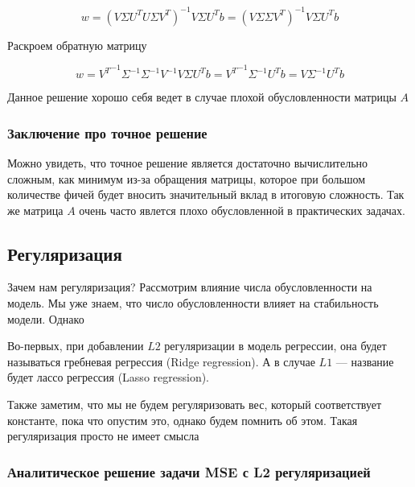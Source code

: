 \documentclass{article}
\begin{document}
    \begin{equation}
        w = (V \Sigma U^{T} U \Sigma V^{T})^{-1} V \Sigma U^{T} b = (V \Sigma \Sigma V^{T})^{-1} V \Sigma U^{T} b
    \end{equation}

    Раскроем обратную матрицу

    \begin{equation}
        w = {V^{T}}^{-1} \Sigma^{-1} \Sigma^{-1} V^{-1} V \Sigma U^{T} b = {V^{T}}^{-1} \Sigma^{-1}  U^{T} b = V \Sigma^{-1}  U^{T} b
    \end{equation}

    Данное решение хорошо себя ведет в случае плохой обусловленности матрицы $A$

    \subsubsection{Заключение про точное решение}

    Можно увидеть, что точное решение является достаточно вычислительно сложным, как минимум из-за обращения матрицы, которое при большом количестве фичей будет 
    вносить значительный вклад в итоговую сложность. Так же матрица $A$ очень часто явлется плохо обусловленной в практических задачах.  
    
    \subsection{Регуляризация}

    Зачем нам регуляризация? Рассмотрим влияние числа обусловленности на модель. Мы уже знаем, что 
    число обусловленности влияет на стабильность модели. Однако 

    Во-первых, при добавлении $L2$ регуляризации в модель регрессии, она будет называться гребневая регрессия (Ridge regression). А в случае
    $L1$ --- название будет лассо регрессия (Lasso regression). 
    
    Также заметим, что мы не будем регуляризовать вес, который соответствует константе, пока что опустим это, однако 
    будем помнить об этом. Такая регуляризация просто не имеет смысла
    
    \subsubsection{Аналитическое решение задачи MSE с L2 регуляризацией}

    \quad 
\end{document}
